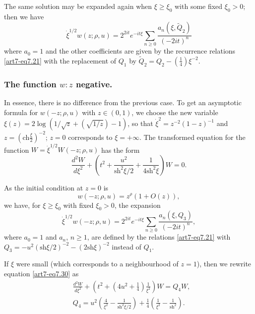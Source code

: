 The same solution may be expanded again when $\xi \geqslant \xi_0$ with some fixed $\xi_0>0$; then we have 
\begin{equation}
\dot{\xi}^{1/2} w(z; \rho , u) = 2^{2 it} e^{-it \xi} \sum\limits_{n \geqslant 0} \frac{a_n(\xi, \tilde{Q}_2)}{(-2 it)^n} \label{art7-eq7.28}
\end{equation}
where $a_0 =1$ and the other coefficients are given by the recurrence relations \eqref{art7-eq7.21} with the replacement of $Q_1$ by $\tilde{Q}_2 =Q_2 - (\frac{1}{4}) \xi^{-2}$.


\setcounter{section}{2}
\subsubsection{The function $w:z$ negative.}\label{art7-subsub2.6.5}
In essence, there is no difference from the previous case. To get an asymptotic formula for $w (-z; \rho, u)$ with $z \in (0,1)$, we choose the new variable $\xi(z) =2 \log (1/\sqrt{z} + (\sqrt{1/z})-1)$, so that $\dot{\xi}^2 = z^{-2} (1-z)^{-1}$ and $z = (\text{ch}\frac{\xi}{2})^{-2}$; $z =0$ corresponds to $\xi = + \infty$. The transformed equation for the function $W = \dot{\xi}^{1/2} W(-z; \rho, u)$ has the form 
\setcounter{section}{7}
\setcounter{equation}{29}
\begin{equation}
\frac{d^2 W}{d\xi^2} + \left( t^2 + \frac{u^2}{\text{sh}^2 \xi/2} + \frac{1}{4 \text{sh}^2 \xi}\right) W = 0.  \label{art7-eq7.30}
\end{equation}

As the initial condition at $z =0$ is 
$$
w(-z; \rho, u) = z^\rho (1+ O(z)),
$$
we have, for $\xi \geqslant \xi_0$ with fixed $\xi_0 > 0$, the expansion
\begin{equation}
\dot{\xi}^{1/2} w (-z; \rho, u) = 2^{2 it} e^{-it \xi} \sum\limits_{n \geqslant 0} \frac{a_n(\xi, Q_3)}{(-2 it)^n}, \label{art7-eq7.31}
\end{equation}
where $a_0 =1$ and $a_n$, $n \geqslant 1$, are defined by the relations \eqref{art7-eq7.21} with $Q_3 = - u^2 (\text{sh} \xi/2)^{-2} -(2 \text{sh} \xi)^{-2}$ instead of $Q_1$.

If $\xi$ were small (which corresponds to a neighbourhood of $z =1$), then we rewrite equation \eqref{art7-eq7.30} as
\begin{equation}
\begin{split}
& \frac{d^2 W}{d \xi^2} + \left(t^2+ \left(4u^2 + \frac{1}{4} \right) \frac{1}{\xi^2} \right) W = Q_4 W,\\
& Q_4 = u^2 \left(\frac{4}{\xi^2} -\frac{1}{\text{sh}^2 \xi/2}  \right) + \frac{1}{4} \left(\frac{1}{\xi^2} - \frac{1}{\text{sh}^2} \right) .
\end{split}\label{art7-eq7.32}
\end{equation}

